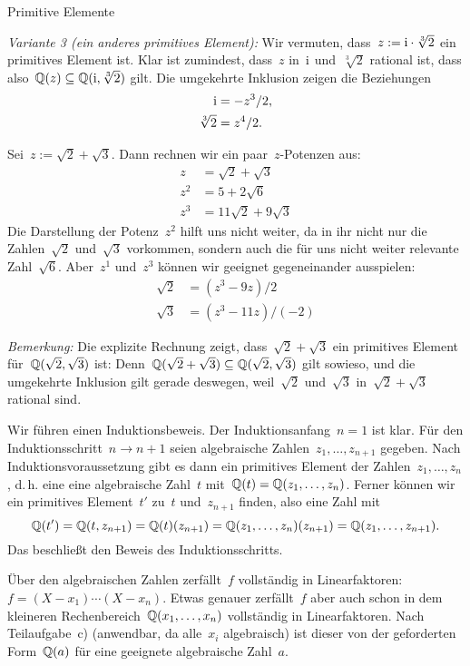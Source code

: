\documentclass{algblatt}
\begin{document}
\begin{aufgabe}{Primitive Elemente}
\begin{loesungE}
\emph{Variante 3 (ein anderes primitives Element):}
Wir vermuten, dass~$z := \mathrm{i} \cdot \sqrt[3]{2}$ ein primitives Element ist. Klar
ist zumindest, dass~$z$ in~$\mathrm{i}$ und~$\sqrt[3]{2}$ rational ist, dass
also~$\mathbb{Q}(z) \subseteq \mathbb{Q}(\mathrm{i},\sqrt[3]{2})$ gilt. Die umgekehrte Inklusion
zeigen die Beziehungen
\begin{align*}
  \mathrm{i} &= -z^3/2, \\
  \sqrt[3]{2} &= z^4/2.
\end{align*}

\item Sei~$z := \sqrt{2} + \sqrt{3}$. Dann rechnen wir ein paar~$z$-Potenzen
aus:
\begin{align*}
  z &= \sqrt{2} + \sqrt{3} \\
  z^2 &= 5 + 2 \sqrt{6} \\
  z^3 &= 11\sqrt{2} + 9\sqrt{3}
\end{align*}
Die Darstellung der Potenz~$z^2$ hilft uns nicht weiter, da in ihr nicht nur
die Zahlen~$\sqrt{2}$ und~$\sqrt{3}$ vorkommen, sondern auch die für uns nicht
weiter relevante Zahl~$\sqrt{6}$. Aber~$z^1$ und~$z^3$ können wir geeignet
gegeneinander ausspielen:
\begin{align*}
  \sqrt{2} &= (z^3 - 9z) / 2 \\
  \sqrt{3} &= (z^3 - 11z) / (-2)
\end{align*}

\emph{Bemerkung:} Die explizite Rechnung zeigt, dass~$\sqrt{2}+\sqrt{3}$ ein
primitives Element für~$\mathbb{Q}(\sqrt{2},\sqrt{3})$ ist:
Denn~$\mathbb{Q}(\sqrt{2}+\sqrt{3}) \subseteq \mathbb{Q}(\sqrt{2},\sqrt{3})$ gilt sowieso,
und die umgekehrte Inklusion gilt gerade deswegen, weil~$\sqrt{2}$
und~$\sqrt{3}$ in~$\sqrt{2}+\sqrt{3}$ rational sind.

\item Wir führen einen Induktionsbeweis. Der Induktionsanfang~$n = 1$ ist klar.
Für den Induktionsschritt~$n \to n + 1$ seien algebraische
Zahlen~$z_1,\ldots,z_{n+1}$ gegeben. Nach Induktionsvoraussetzung gibt es dann
ein primitives Element der Zahlen~$z_1,\ldots,z_n$, d.\,h. eine
eine algebraische Zahl~$t$ mit~$\mathbb{Q}(t) = \mathbb{Q}(z_1,\ldots,z_n)$. Ferner können
wir ein primitives Element~$t'$ zu~$t$ und~$z_{n+1}$ finden, also eine Zahl mit
\[ \mathbb{Q}(t') = \mathbb{Q}(t,z_{n+1}) = \mathbb{Q}(t)(z_{n+1}) = \mathbb{Q}(z_1,\ldots,z_n)(z_{n+1}) =
\mathbb{Q}(z_1,\ldots,z_{n+1}). \]
Das beschließt den Beweis des Induktionsschritts.

\item Über den algebraischen Zahlen zerfällt~$f$ vollständig in
Linearfaktoren:~$f = (X-x_1) \cdots (X-x_n)$. Etwas genauer zerfällt~$f$ aber
auch schon in dem kleineren Rechenbereich~$\mathbb{Q}(x_1,\ldots,x_n)$ vollständig in
Linearfaktoren. Nach Teilaufgabe~c) (anwendbar, da alle~$x_i$ algebraisch) ist
dieser von der geforderten Form~$\mathbb{Q}(a)$ für eine geeignete algebraische
Zahl~$a$.
\end{loesungE}
\end{aufgabe}
\end{document}

